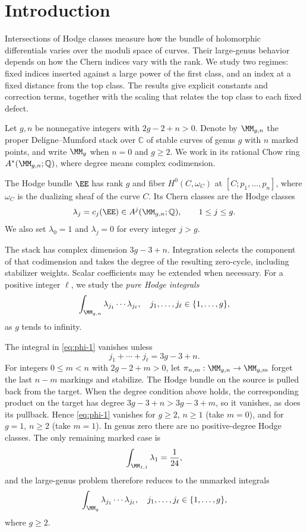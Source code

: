 \section{Introduction}
\label{sec:introduction}

Intersections of Hodge classes measure how the bundle of holomorphic
differentials varies over the moduli space of curves. Their
large-genus behavior depends on how the Chern indices vary with
the rank. We study two regimes: fixed indices inserted against a
large power of the first class, and an index at a fixed distance
from the top class. The results give explicit constants and
correction terms, together with the scaling that relates the top
class to each fixed defect.

Let $g,n$ be nonnegative integers with $2g-2+n>0$.  Denote by
$\MM_{g,n}$ the proper Deligne--Mumford stack over $\mathbb C$ of
stable curves of genus $g$ with $n$ marked points, and write $\MM_g$
when $n=0$ and $g\geq2$.  We work in its rational Chow ring
$A^*(\MM_{g,n};\mathbb Q)$, where degree means complex codimension.

The Hodge bundle $\EE$ has rank $g$ and fiber $H^0(C,\omega_C)$ at
$[C;p_1,\ldots,p_n]$, where $\omega_C$ is the dualizing sheaf of the
curve $C$.  Its Chern classes are the Hodge classes
\[\lambda_j=c_j(\EE)\in A^j(\MM_{g,n};\mathbb Q),
\qquad 1\leq j\leq g.\]
We also set $\lambda_0=1$ and $\lambda_j=0$ for every integer $j>g$.

The stack has complex dimension $3g-3+n$.  Integration selects the
component of that codimension and takes the degree of the resulting
zero-cycle, including stabilizer weights.  Scalar
coefficients may be extended when necessary.  For a positive integer
$\ell$, we study the \emph{pure Hodge integrals}
\begin{equation}
\int_{\MM_{g,n}}\lambda_{j_1}\cdots \lambda_{j_\ell},\quad j_1, \dots, j_\ell \in \{1, \dots, g\},
\label{eq:phi-1}
\end{equation}
as $g$ tends to infinity.

The integral in \eqref{eq:phi-1} vanishes unless
\[j_1+\cdots+j_\ell=3g-3+n.\]
For integers $0\leq m<n$ with $2g-2+m>0$, let
$\pi_{n,m}:\MM_{g,n}\to\MM_{g,m}$ forget the last $n-m$ markings
and stabilize.  The Hodge bundle on the source is pulled back from the
target.  When the degree condition above holds, the corresponding
product on the target has degree $3g-3+n>3g-3+m$, so it vanishes,
as does its pullback.  Hence \eqref{eq:phi-1} vanishes for $g\geq2$,
$n\geq1$ (take $m=0$), and for $g=1$, $n\geq2$ (take $m=1$).
In genus zero there are no positive-degree Hodge classes.  The only
remaining marked case is
\[\int_{\MM_{1,1}}\lambda_1=\frac{1}{24},\]
and the large-genus problem therefore reduces to the unmarked integrals
\begin{equation}
\int_{\MM_g}\lambda_{j_1}\cdots \lambda_{j_\ell},
\quad j_1, \dots, j_\ell \in \{1, \dots, g\},
\label{eq:phi-2}
\end{equation}
where $g\ge 2$.

